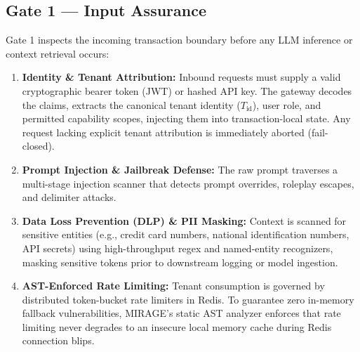 \documentclass[11pt,a4paper]{article}
\begin{document}
\subsection{Gate 1 — Input Assurance}
Gate 1 inspects the incoming transaction boundary before any LLM inference or context retrieval occurs:
\begin{enumerate}[leftmargin=*,itemsep=2pt]
  \item \textbf{Identity \& Tenant Attribution:} Inbound requests must supply a valid cryptographic bearer token (JWT) or hashed API key. The gateway decodes the claims, extracts the canonical tenant identity ($T_{\text{id}}$), user role, and permitted capability scopes, injecting them into transaction-local state. Any request lacking explicit tenant attribution is immediately aborted (fail-closed).
  \item \textbf{Prompt Injection \& Jailbreak Defense:} The raw prompt traverses a multi-stage injection scanner that detects prompt overrides, roleplay escapes, and delimiter attacks.
  \item \textbf{Data Loss Prevention (DLP) \& PII Masking:} Context is scanned for sensitive entities (e.g., credit card numbers, national identification numbers, API secrets) using high-throughput regex and named-entity recognizers, masking sensitive tokens prior to downstream logging or model ingestion.
  \item \textbf{AST-Enforced Rate Limiting:} Tenant consumption is governed by distributed token-bucket rate limiters in Redis. To guarantee zero in-memory fallback vulnerabilities, MIRAGE's static AST analyzer enforces that rate limiting never degrades to an insecure local memory cache during Redis connection blips.
\end{enumerate}
\end{document}
